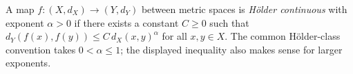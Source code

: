 
A map $f:(X,d_X)\to(Y,d_Y)$ between metric spaces is \emph{Hölder continuous} with exponent $\alpha>0$ if there exists a constant $C\ge0$ such that $d_Y(f(x),f(y))\le C\,d_X(x,y)^\alpha$ for all $x,y\in X$. The common Hölder-class convention takes $0<\alpha\le1$; the displayed inequality also makes sense for larger exponents.
